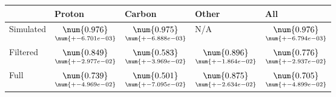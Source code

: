 \begin{tabular}{lllll}
\toprule
{} &                                              Proton &                                              Carbon &                                               Other &                                                 All \\
\midrule
Simulated &  $\underset{\num{+- 6.701e-03 }  }{\num{ 0.976 } }$ &  $\underset{\num{+- 6.888e-03 }  }{\num{ 0.975 } }$ &  N/A &  $\underset{\num{+- 6.794e-03 }  }{\num{ 0.976 } }$ \\
Filtered  &  $\underset{\num{+- 2.977e-02 }  }{\num{ 0.849 } }$ &  $\underset{\num{+- 3.969e-02 }  }{\num{ 0.583 } }$ &  $\underset{\num{+- 1.864e-02 }  }{\num{ 0.896 } }$ &  $\underset{\num{+- 2.937e-02 }  }{\num{ 0.776 } }$ \\
Full      &  $\underset{\num{+- 4.969e-02 }  }{\num{ 0.739 } }$ &  $\underset{\num{+- 7.095e-02 }  }{\num{ 0.501 } }$ &  $\underset{\num{+- 2.634e-02 }  }{\num{ 0.875 } }$ &  $\underset{\num{+- 4.899e-02 }  }{\num{ 0.705 } }$ \\
\bottomrule
\end{tabular}
